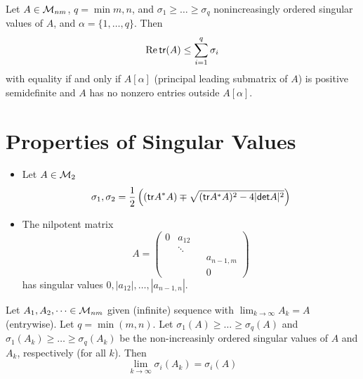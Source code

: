 \documentclass[aspectratio=169]{beamer}
\begin{document}
\begin{frame}
\begin{theorem}
	Let $A\in \mathcal{M}_{nm}$, $q= \min{m,n}$, and $\sigma_1\geq \dots \geq \sigma_q$ nonincreasingly ordered singular values of $A$, and $\alpha= \{1, \dots, q\}$. Then 
	\[\operatorname{Re}\mathsf{tr}(A)\leq \sum\limits_{i=1}^q\sigma_i\]
	with equality if and only if $A[\alpha]$ (principal leading submatrix of $A$) is positive semidefinite and $A$ has no nonzero entries outside $A[\alpha]$. 
\end{theorem}
\end{frame}

\section{Properties of Singular Values}


\begin{frame}
\begin{itemize}
	\item Let $A\in\mathcal{M}_2$
	\[\sigma_1, \sigma_2= \dfrac{1}{2}\left((\mathsf{tr} A^*A) \mp \sqrt{(\mathsf{tr} A^* A)^2-4|\mathsf{det} A|^2} \right)\]
	\item The nilpotent matrix 
	\[A= \begin{pmatrix}
	0& a_{12}& \\
	& \ddots& \\
	& & & a_{n-1, m}\\
	& & &0
	\end{pmatrix}\]
	has singular values $0, |a_{12}|, \dots, |a_{n-1,n}| $.
\end{itemize}
\end{frame}

\begin{frame}
\begin{theorem}
	Let $A_1, A_2, \dots \in \mathcal{M}_{nm}$ given (infinite) sequence with $\lim_{k\to \infty} A_k=A$ (entrywise). Let $q= \min (m,n)$. Let $\sigma_1 (A)\geq \dots \geq \sigma_q(A)$ and $\sigma_1 (A_k)\geq \dots \geq \sigma_q(A_k)$ be the non-increasinly ordered singular values of $A$ and $A_k$, respectively (for all $k$). Then 
	\[
		\lim_{k\to \infty}\sigma_i(A_k)= \sigma_i(A)
	\]
\end{theorem}
\end{frame}
\end{document}
